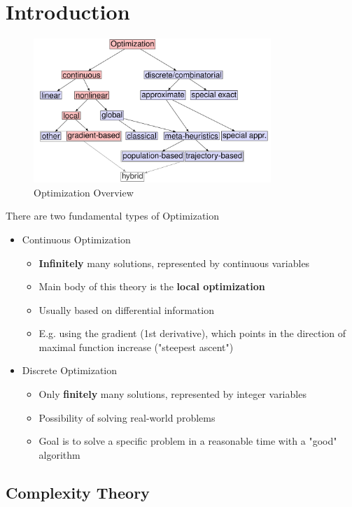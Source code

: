 \section{Introduction}

\begin{figure}[H]
\centering
\includegraphics[width=0.8\textwidth]{figures/overview.png}
\caption{Optimization Overview}
\end{figure}

There are two fundamental types of Optimization
\begin{itemize}
    \item Continuous Optimization
    \begin{itemize}
        \item \textbf{Infinitely} many solutions, represented by continuous variables
        \item Main body of this theory is the \textbf{local optimization}
        \item Usually based on differential information
        \item E.g. using the gradient (1st derivative), which points in the direction of maximal function increase ("steepest ascent")
    \end{itemize}
    \item Discrete Optimization
    \begin{itemize}
        \item Only \textbf{finitely} many solutions, represented by integer variables
        \item Possibility of solving real-world problems
        \item Goal is to solve a specific problem in a reasonable time with a "good" algorithm
    \end{itemize}
\end{itemize}

\subsection{Complexity Theory}

